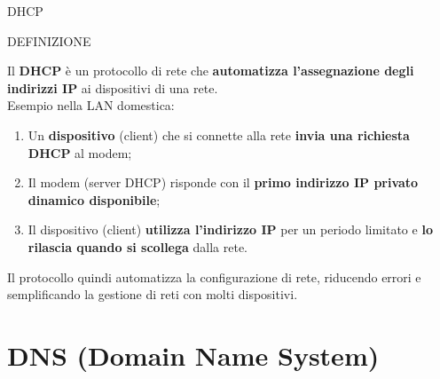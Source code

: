 \documentclass[aspectratio=1610]{beamer}
\begin{document}
\begin{frame}{DHCP}
    \begin{alertblock}{DEFINIZIONE}
        \begin{minipage}{0.98\linewidth}
            \justifying
            Il \textbf{DHCP} è un protocollo di rete che \textbf{automatizza l'assegnazione degli indirizzi IP} ai 
            dispositivi di una rete.\\
            \bigskip
            Esempio nella LAN domestica:            
            \begin{enumerate}
                \pause
                \item Un \textbf{dispositivo} (client) che si connette alla rete \textbf{invia una richiesta DHCP} al modem;
                \pause
                \item Il modem (server DHCP) risponde con il \textbf{primo indirizzo IP privato dinamico disponibile};
                \pause
                \item  Il dispositivo (client) \textbf{utilizza l'indirizzo IP} per un periodo limitato e \textbf{lo rilascia
                quando si scollega} dalla rete.
            \end{enumerate}            
            Il protocollo quindi automatizza la configurazione di rete, riducendo errori e semplificando la 
            gestione di reti con molti dispositivi.
        \end{minipage}
    \end{alertblock}
\end{frame}

\section{DNS (Domain Name System)}
\end{document}
